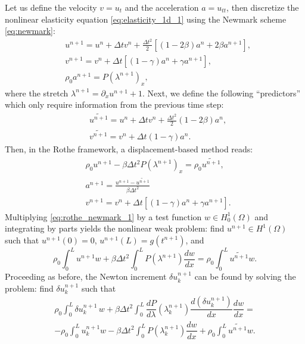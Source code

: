 \documentclass{sfuthesis}
\numberwithin{equation}{section}
\numberwithin{figure}{chapter}
\numberwithin{table}{chapter}
\theoremstyle{definition}
\newcommand{\der}[2]{\dfrac{d #1}{d #2}}
\begin{document}
Let us define the velocity $v = u_t$ and the acceleration $a = u_{tt}$, then discretize the nonlinear elasticity equation \eqref{eq:elasticity_1d_1} using the Newmark scheme \eqref{eq:newmark}:
\begin{subequations} \label{eq:rothe_newmark}
    \begin{align}
        \label{eq:newmark_2}&u^{n+1} = u^n + \Delta t v^n + \frac{\Delta t^2}{2} \left[ (1-2\beta) a^n + 2 \beta a^{n+1} \right], \\
        \label{eq:newmark_1}&v^{n+1} = v^n + \Delta t \left[ (1-\gamma) a^n + \gamma a^{n+1} \right], \\
	    \label{eq:newmark_3}& \rho_0 a^{n+1} = P(\lambda^{n+1})_x,
    \end{align}
\end{subequations}
where the stretch $\lambda^{n+1} = \partial_x u^{n+1} + 1$. Next, we define the following ``predictors'' which only require information from the previous time step:
\begin{subequations} \label{eq:rothe_newmark_predictors}
    \begin{align}
	    & \widetilde{u^{n+1}} = u^n + \Delta t v^n + \frac{\Delta t^2}{2} (1-2\beta) a^n, \\
        & \widetilde{v^{n+1}} = v^n + \Delta t (1-\gamma) a^n.
    \end{align}
\end{subequations}
Then, in the Rothe framework, a displacement-based method reads:
\begin{subequations}
    \begin{align}
        \label{eq:rothe_newmark_1}&\rho_0 u^{n+1} - \beta \Delta t^2  P(\lambda^{n+1})_x = \rho_0 \widetilde{u^{n+1}}, \\
	    &a^{n+1} = \frac{u^{n+1}-\widetilde{u^{n+1}}}{\beta \Delta t^2} \\
	    &v^{n+1} = v^n + \Delta t \left[ (1-\gamma) a^n + \gamma a^{n+1} \right].
    \end{align}
\end{subequations}
Multiplying \eqref{eq:rothe_newmark_1} by a test function $w \in H_0^1(\Omega)$ and integrating by parts yields the nonlinear weak problem: find $u^{n+1} \in  H^1(\Omega)$ such that $u^{n+1}(0) = 0$, $u^{n+1}(L) = g(t^{n+1})$, and
\begin{equation}
    \rho_0 \int_0^L u^{n+1}w + \beta \Delta t^2 \int_0^L P(\lambda^{n+1}) \der{w}{x} = \rho_0 \int_0^L \widetilde{u^{n+1}}w.
\end{equation}
Proceeding as before, the Newton increment $\delta u_k^{n+1}$ can be found by solving the problem: find $\delta u_k^{n+1}$ such that
\begin{multline} 
	\rho_0 \int_0^L \delta u_k^{n+1} \, w + \beta \Delta t^2 \int_0^L \der{P}{\lambda}(\lambda_k^{n+1}) \der{(\delta u_k^{n+1})}{x} \der{w}{x} = \\
	-\rho_0 \int_0^L u_k^{n+1} w - \beta \Delta t^2 \int_0^L P(\lambda_k^{n+1})  \der{w}{x} + \rho_0 \int_0^L \widetilde{u^{n+1}} w.
\end{multline}
\end{document}
